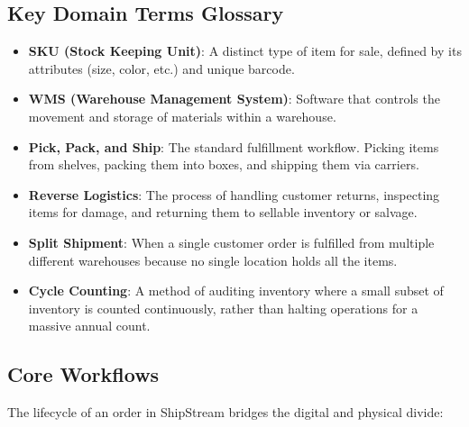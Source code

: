 \documentclass[
  11pt,
  openany,
  oneside]{book}
\providecommand{\tightlist}{%
  \setlength{\itemsep}{0pt}\setlength{\parskip}{0pt}}
\begin{document}
\subsection{Key Domain Terms
Glossary}\label{key-domain-terms-glossary-2}

\begin{itemize}
\tightlist
\item
  \textbf{SKU (Stock Keeping Unit)}: A distinct type of item for sale,
  defined by its attributes (size, color, etc.) and unique barcode.
\item
  \textbf{WMS (Warehouse Management System)}: Software that controls the
  movement and storage of materials within a warehouse.
\item
  \textbf{Pick, Pack, and Ship}: The standard fulfillment workflow.
  Picking items from shelves, packing them into boxes, and shipping them
  via carriers.
\item
  \textbf{Reverse Logistics}: The process of handling customer returns,
  inspecting items for damage, and returning them to sellable inventory
  or salvage.
\item
  \textbf{Split Shipment}: When a single customer order is fulfilled
  from multiple different warehouses because no single location holds
  all the items.
\item
  \textbf{Cycle Counting}: A method of auditing inventory where a small
  subset of inventory is counted continuously, rather than halting
  operations for a massive annual count.
\end{itemize}

\subsection{Core Workflows}\label{core-workflows-2}

The lifecycle of an order in ShipStream bridges the digital and physical
divide:
\end{document}

